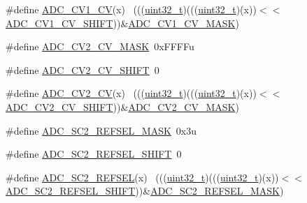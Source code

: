 \begin{DoxyCompactItemize}
\item 
\#define \hyperlink{group___a_d_c___register___masks_ga9bf037e1e55f3cda8a60192a483df312}{A\+D\+C\+\_\+\+C\+V1\+\_\+\+CV}(x)                                                    ~(((\hyperlink{_p_e___types_8h_a33594304e786b158f3fb30289278f5af}{uint32\+\_\+t})(((\hyperlink{_p_e___types_8h_a33594304e786b158f3fb30289278f5af}{uint32\+\_\+t})(x))$<$$<$\hyperlink{group___a_d_c___register___masks_ga1925520ab1dd2eb81e0e4505af905c13}{A\+D\+C\+\_\+\+C\+V1\+\_\+\+C\+V\+\_\+\+S\+H\+I\+FT}))\&\hyperlink{group___a_d_c___register___masks_gad67c3b5f385cd9b26be8257134e1e3cf}{A\+D\+C\+\_\+\+C\+V1\+\_\+\+C\+V\+\_\+\+M\+A\+SK})
\item 
\#define \hyperlink{group___a_d_c___register___masks_gab61d022e3c8d84d77f2895a91c049023}{A\+D\+C\+\_\+\+C\+V2\+\_\+\+C\+V\+\_\+\+M\+A\+SK}~0x\+F\+F\+F\+Fu
\item 
\#define \hyperlink{group___a_d_c___register___masks_ga5ecccc775bd06291531df6e989024d38}{A\+D\+C\+\_\+\+C\+V2\+\_\+\+C\+V\+\_\+\+S\+H\+I\+FT}~0
\item 
\#define \hyperlink{group___a_d_c___register___masks_ga0fb4a2da1223e4604f4007e6b0ad5873}{A\+D\+C\+\_\+\+C\+V2\+\_\+\+CV}(x)                                                    ~(((\hyperlink{_p_e___types_8h_a33594304e786b158f3fb30289278f5af}{uint32\+\_\+t})(((\hyperlink{_p_e___types_8h_a33594304e786b158f3fb30289278f5af}{uint32\+\_\+t})(x))$<$$<$\hyperlink{group___a_d_c___register___masks_ga5ecccc775bd06291531df6e989024d38}{A\+D\+C\+\_\+\+C\+V2\+\_\+\+C\+V\+\_\+\+S\+H\+I\+FT}))\&\hyperlink{group___a_d_c___register___masks_gab61d022e3c8d84d77f2895a91c049023}{A\+D\+C\+\_\+\+C\+V2\+\_\+\+C\+V\+\_\+\+M\+A\+SK})
\item 
\#define \hyperlink{group___a_d_c___register___masks_gaa821d1e2e4575c757e9446da61b2230a}{A\+D\+C\+\_\+\+S\+C2\+\_\+\+R\+E\+F\+S\+E\+L\+\_\+\+M\+A\+SK}~0x3u
\item 
\#define \hyperlink{group___a_d_c___register___masks_gaab9b293eb54de2d9d246766002e44556}{A\+D\+C\+\_\+\+S\+C2\+\_\+\+R\+E\+F\+S\+E\+L\+\_\+\+S\+H\+I\+FT}~0
\item 
\#define \hyperlink{group___a_d_c___register___masks_gab917ad82f292ba65ae5b3fddb400bd70}{A\+D\+C\+\_\+\+S\+C2\+\_\+\+R\+E\+F\+S\+EL}(x)                                            ~(((\hyperlink{_p_e___types_8h_a33594304e786b158f3fb30289278f5af}{uint32\+\_\+t})(((\hyperlink{_p_e___types_8h_a33594304e786b158f3fb30289278f5af}{uint32\+\_\+t})(x))$<$$<$\hyperlink{group___a_d_c___register___masks_gaab9b293eb54de2d9d246766002e44556}{A\+D\+C\+\_\+\+S\+C2\+\_\+\+R\+E\+F\+S\+E\+L\+\_\+\+S\+H\+I\+FT}))\&\hyperlink{group___a_d_c___register___masks_gaa821d1e2e4575c757e9446da61b2230a}{A\+D\+C\+\_\+\+S\+C2\+\_\+\+R\+E\+F\+S\+E\+L\+\_\+\+M\+A\+SK})
$$
\end{DoxyCompactItemize}
